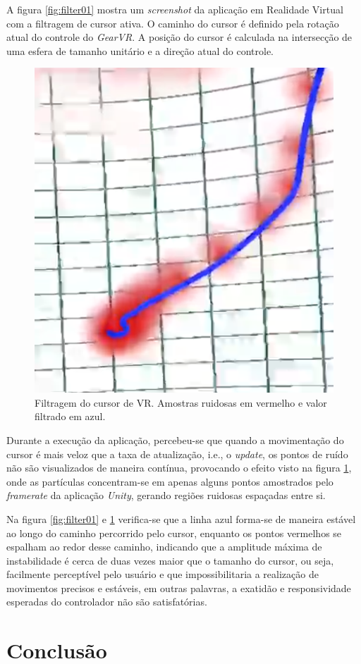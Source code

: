 \documentclass[conference]{IEEEtran}
\begin{document}
A figura \ref{fig:filter01} mostra um \textit{screenshot} da aplicação em Realidade Virtual com a filtragem de cursor ativa. O caminho do cursor é definido pela rotação atual do controle do \textit{GearVR}. A posição do cursor é calculada na intersecção de uma esfera de tamanho unitário e a direção atual do controle.

\begin{figure}[ht]
\centering
\includegraphics[width=.5\textwidth]{images/image_02.png}
\caption{Filtragem do cursor de VR. Amostras ruidosas em vermelho e valor filtrado em azul.}
\label{fig:filter02}
\end{figure}

Durante a execução da aplicação, percebeu-se que quando a movimentação do cursor é mais veloz que a taxa de atualização, i.e., o \textit{update}, os pontos de ruído não são visualizados de maneira contínua, provocando o efeito visto na figura \ref{fig:filter02}, onde as partículas concentram-se em apenas alguns pontos amostrados pelo \textit{framerate} da aplicação \textit{Unity}, gerando regiões ruidosas espaçadas entre si.

Na figura \ref{fig:filter01} e \ref{fig:filter02} verifica-se que a linha azul forma-se de maneira estável ao longo do caminho percorrido pelo cursor, enquanto os pontos vermelhos se espalham ao redor desse caminho, indicando que a amplitude máxima de instabilidade é cerca de duas vezes maior que o tamanho do cursor, ou seja, facilmente perceptível pelo usuário e que impossibilitaria a realização de movimentos precisos e estáveis, em outras palavras, a exatidão e responsividade esperadas do controlador não são satisfatórias.

\section{Conclusão} \label{sec:conclusion}
\end{document}
